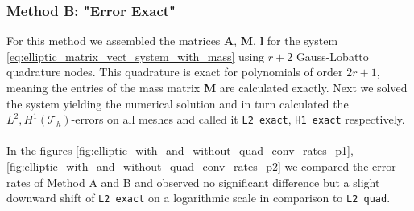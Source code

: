\subsubsection*{Method B: "Error Exact"}
For this method we assembled the matrices \textbf{A}, \textbf{M}, \textbf{l} for the system 
\ref{eq:elliptic_matrix_vect_system_with_mass} using $r+2$ Gauss-Lobatto quadrature nodes. This quadrature is exact for polynomials of order $2r+1$,
meaning the entries of the mass matrix \textbf{M} are calculated exactly. Next we solved the system yielding the numerical solution and in turn
calculated the $L^2, H^1(\mathcal{T}_h)$-errors on all meshes and called it \texttt{L2 exact}, \texttt{H1 exact}
respectively. 
\\ \\
In the figures \ref{fig:elliptic_with_and_without_quad_conv_rates_p1}, \ref{fig:elliptic_with_and_without_quad_conv_rates_p2} we compared 
the error rates of Method A and B and observed no significant difference but a slight downward shift of \texttt{L2 exact} on a logarithmic scale 
in comparison to \texttt{L2 quad}.